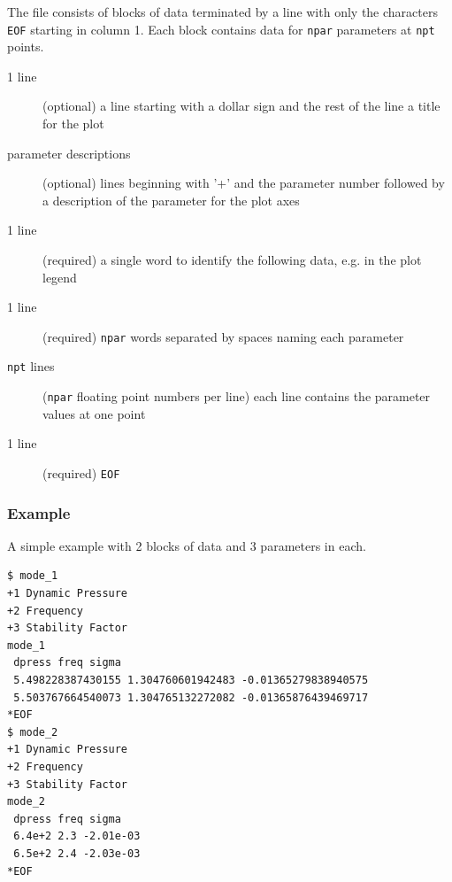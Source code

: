 \documentclass[11pt,openany,twoside]{book}
\numberwithin{equation}{section}		%
\newcommand{\Code}[1]{{\small\tt #1}}
\begin{document}
The file consists of blocks of data terminated by a line with
only the characters \Code{*EOF} starting in column 1. Each block
contains data for \Code{npar} parameters at \Code{npt} points.
\begin{description}
	\item[1 line] (optional) a line starting with a dollar sign and
		the rest of the line a title for the plot 
	\item[parameter descriptions] (optional) lines beginning with '+' and the parameter number
			followed by a description of the parameter for the plot axes
	\item[1 line] (required) a single word to identify the following
			data, e.g. in the plot legend
	\item[1 line] (required) \Code{npar} words separated by spaces naming each
			parameter
	\item[\Code{npt} lines] (\Code{npar} floating point numbers per line)
			each line contains the parameter values at one point
	\item[1 line] (required) \Code{*EOF}
\end{description}

\subsubsection{Example} A simple example with 2 blocks of data and
3 parameters in each.
\begin{lstlisting}
$ mode_1
+1 Dynamic Pressure
+2 Frequency
+3 Stability Factor
mode_1
 dpress freq sigma
 5.498228387430155 1.304760601942483 -0.01365279838940575
 5.503767664540073 1.304765132272082 -0.01365876439469717
*EOF
$ mode_2
+1 Dynamic Pressure
+2 Frequency
+3 Stability Factor
mode_2
 dpress freq sigma
 6.4e+2 2.3 -2.01e-03
 6.5e+2 2.4 -2.03e-03
*EOF
\end{lstlisting}
\end{document}
